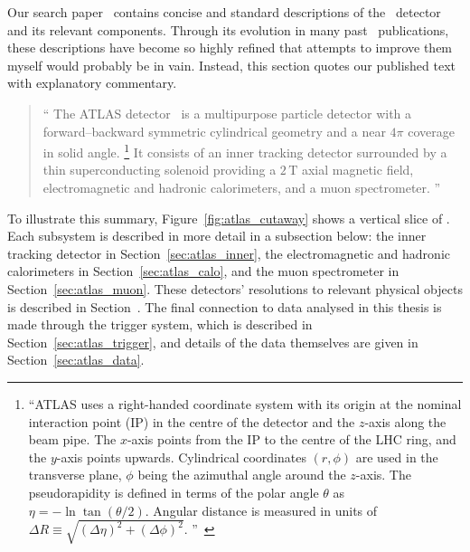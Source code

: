 Our search paper~\cite{atlas2022searches} contains concise and standard
descriptions of the \atlas\ detector and its relevant components.
Through its evolution in many past \atlas\ publications, these descriptions
have become so highly refined that attempts to improve them myself would
probably be in vain.
Instead, this section quotes our published text with explanatory commentary.
\begin{quote}
``%
The ATLAS detector~\cite{atlas2008experiment} is a multipurpose particle
detector with a forward--backward symmetric cylindrical geometry and a near
$4\pi$ coverage in solid angle.%
\footnote{%
``ATLAS uses a right-handed coordinate system with its origin at the nominal
interaction point (IP) in the centre of the detector and the $z$-axis along the
beam pipe.
The $x$-axis points from the IP to the centre of the LHC ring, and the $y$-axis
points upwards.
Cylindrical coordinates $(r,\phi)$ are used in the transverse plane, $\phi$
being the azimuthal angle around the $z$-axis.
The pseudorapidity is defined in terms of the polar angle $\theta$ as
$\eta = -\ln \tan(\theta/2)$.
Angular distance is measured in units of
$\Delta R \equiv \sqrt{(\Delta\eta)^{2} + (\Delta\phi)^{2}}$.%
''\footnotemark~\cite{atlas2022searches}%
}
It consists of an inner tracking detector surrounded by a thin superconducting
solenoid providing a $2\,\mathrm{T}$ axial magnetic field, electromagnetic and
hadronic calorimeters, and a muon spectrometer.%
''~\cite{atlas2022searches}
\end{quote}
To illustrate this summary, Figure~\ref{fig:atlas_cutaway} shows a vertical slice
of \atlas.
Each subsystem is described in more detail in a subsection below:
the inner tracking detector in Section~\ref{sec:atlas_inner},
the electromagnetic and hadronic calorimeters in
Section~\ref{sec:atlas_calo},
and
the muon spectrometer in Section~\ref{sec:atlas_muon}.
These detectors' resolutions to relevant physical objects is described in
Section~\label{sec:atlas_object_resolutions}.
The final connection to data analysed in this thesis is made through the
trigger system, which is described in Section~\ref{sec:atlas_trigger},
and details of the data themselves are given in
Section~\ref{sec:atlas_data}.



